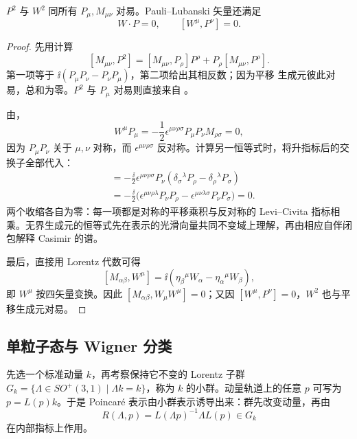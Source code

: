 \begin{proposition}
$P^2$ 与 $W^2$ 同所有 $P_\mu,M_{\mu\nu}$ 对易。Pauli--Lubanski
矢量还满足
\begin{equation}
W\cdot P=0,\qquad [W^\mu,P^\nu]=0.
\label{eq:pauli-lubanski-identities}
\end{equation}
\end{proposition}

\begin{proof}
先用计算
\[
[M_{\mu\nu},P^2]
=[M_{\mu\nu},P_\rho]P^\rho
+P_\rho[M_{\mu\nu},P^\rho].
\]
第一项等于
$\ii(P_\mu P_\nu-P_\nu P_\mu)$，第二项给出其相反数；因为平移
生成元彼此对易，总和为零。$P^2$ 与 $P_\mu$ 对易则直接来自
。

由，
\[
W^\mu P_\mu
=-\frac12\epsilon^{\mu\nu\rho\sigma}
P_\mu P_\nu M_{\rho\sigma}=0,
\]
因为 $P_\mu P_\nu$ 关于 $\mu,\nu$ 对称，而
$\epsilon^{\mu\nu\rho\sigma}$ 反对称。计算另一恒等式时，将升指标后的交换子全部代入：
\begin{align*}
 [W^\mu,P^\lambda]
 &=-\frac{\ii}{2}\epsilon^{\mu\nu\rho\sigma}P_\nu
 (\delta_\sigma{}^\lambda P_\rho-\delta_\rho{}^\lambda P_\sigma)\\
 &=-\frac{\ii}{2}\bigl(
 \epsilon^{\mu\nu\rho\lambda}P_\nu P_\rho
 -\epsilon^{\mu\nu\lambda\sigma}P_\nu P_\sigma\bigr)=0.
\end{align*}
两个收缩各自为零：每一项都是对称的平移乘积与反对称的 Levi--Civita 指标相乘。无界生成元的恒等式先在表示的光滑向量共同不变域上理解，再由相应自伴闭包解释 Casimir 的谱。

最后，直接用 Lorentz 代数可得
\[
[M_{\alpha\beta},W^\mu]
=\ii(\eta_\beta{}^\mu W_\alpha-\eta_\alpha{}^\mu W_\beta),
\]
即 $W^\mu$ 按四矢量变换。因此
$[M_{\alpha\beta},W_\mu W^\mu]=0$；又因
$[W^\mu,P^\nu]=0$，$W^2$ 也与平移生成元对易。
\end{proof}

\subsection{单粒子态与 Wigner 分类}
\label{sec:wigner-classification}

先选一个标准动量 $k$，再考察保持它不变的 Lorentz 子群 $G_k=\{\Lambda\in SO^+(3,1)\mid\Lambda k=k\}$，称为 $k$ 的小群。动量轨道上的任意 $p$ 可写为 $p=L(p)k$。于是 Poincar\'e 表示由小群表示诱导出来：群先改变动量，再由
\[
R(\Lambda,p)=L(\Lambda p)^{-1}\Lambda L(p)\in G_k
\]
在内部指标上作用。

